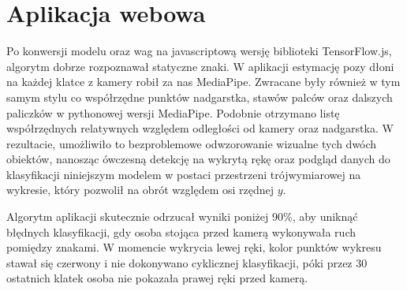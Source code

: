 \section{Aplikacja webowa}
\label{sec:web-application}

Po konwersji modelu oraz wag na javascriptową wersję biblioteki TensorFlow.js, algorytm dobrze rozpoznawał statyczne znaki. W aplikacji estymację pozy dłoni na każdej klatce z kamery robił za nas MediaPipe. Zwracane były również w tym samym stylu co współrzędne punktów nadgarstka, stawów palców oraz dalszych paliczków w pythonowej wersji MediaPipe. Podobnie otrzymano listę współrzędnych relatywnych względem odległości od kamery oraz nadgarstka. W rezultacie, umożliwiło to bezproblemowe odwzorowanie wizualne tych dwóch obiektów, nanosząc ówczesną detekcję na wykrytą rękę oraz podgląd danych do klasyfikacji niniejszym modelem w postaci przestrzeni trójwymiarowej na wykresie, który pozwolił na obrót względem osi rzędnej $y$.

Algorytm aplikacji skutecznie odrzucał wyniki poniżej 90\%, aby uniknąć błędnych klasyfikacji, gdy osoba stojąca przed kamerą wykonywała ruch pomiędzy znakami. W momencie wykrycia lewej ręki, kolor punktów wykresu stawał się czerwony i nie dokonywano cyklicznej klasyfikacji, póki przez 30 ostatnich klatek osoba nie pokazała prawej ręki przed kamerą.

